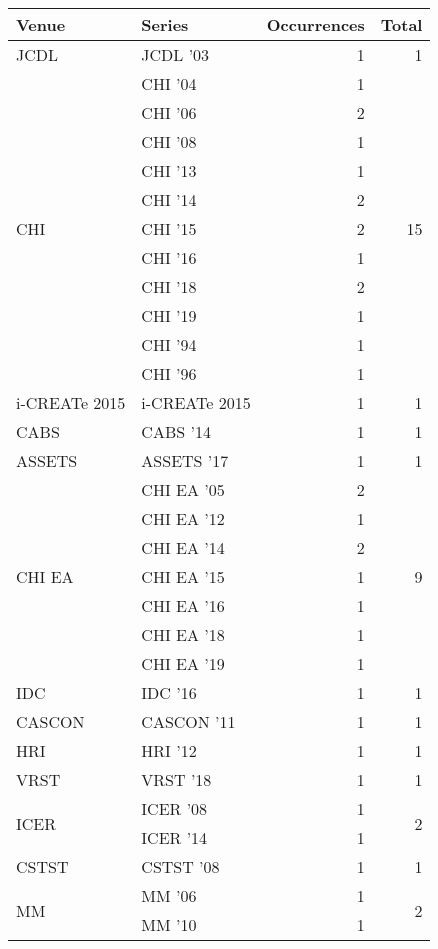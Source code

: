 \begin{table*}[t]
\begin{tabular}{llrr}
Venue & Series & Occurrences & Total\\\hline
\multirow{1}{*}{JCDL } & JCDL '03 & 1 & \multirow{1}{*}{1}\\
\multirow{11}{*}{CHI } & CHI '04 & 1 & \multirow{11}{*}{15}\\
& CHI '06 & 2 &\\
& CHI '08 & 1 &\\
& CHI '13 & 1 &\\
& CHI '14 & 2 &\\
& CHI '15 & 2 &\\
& CHI '16 & 1 &\\
& CHI '18 & 2 &\\
& CHI '19 & 1 &\\
& CHI '94 & 1 &\\
& CHI '96 & 1 &\\
\multirow{1}{*}{i-CREATe 2015} & i-CREATe 2015 & 1 & \multirow{1}{*}{1}\\
\multirow{1}{*}{CABS } & CABS '14 & 1 & \multirow{1}{*}{1}\\
\multirow{1}{*}{ASSETS } & ASSETS '17 & 1 & \multirow{1}{*}{1}\\
\multirow{7}{*}{CHI EA } & CHI EA '05 & 2 & \multirow{7}{*}{9}\\
& CHI EA '12 & 1 &\\
& CHI EA '14 & 2 &\\
& CHI EA '15 & 1 &\\
& CHI EA '16 & 1 &\\
& CHI EA '18 & 1 &\\
& CHI EA '19 & 1 &\\
\multirow{1}{*}{IDC } & IDC '16 & 1 & \multirow{1}{*}{1}\\
\multirow{1}{*}{CASCON } & CASCON '11 & 1 & \multirow{1}{*}{1}\\
\multirow{1}{*}{HRI } & HRI '12 & 1 & \multirow{1}{*}{1}\\
\multirow{1}{*}{VRST } & VRST '18 & 1 & \multirow{1}{*}{1}\\
\multirow{2}{*}{ICER } & ICER '08 & 1 & \multirow{2}{*}{2}\\
& ICER '14 & 1 &\\
\multirow{1}{*}{CSTST } & CSTST '08 & 1 & \multirow{1}{*}{1}\\
\multirow{2}{*}{MM } & MM '06 & 1 & \multirow{2}{*}{2}\\
& MM '10 & 1 &\\

\end{tabular}
\end{table*}
